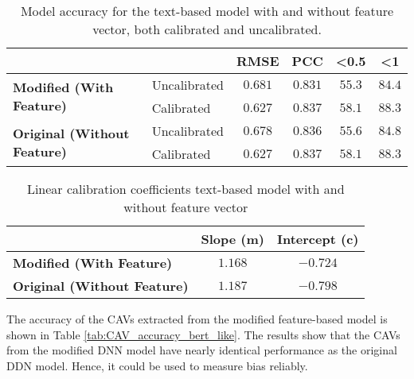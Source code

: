 \begin{table}[H]
    \centering
    \begin{tabular}{|l|l|c|c|c|c|}
        \hline
        \multicolumn{2}{|l|}{\textbf{}} & \textbf{RMSE} & \textbf{PCC} & \textbf{\textless 0.5} & \textbf{\textless 1}          \\ \hline
        \multirow{2}{*}{\textbf{Modified (With Feature)}}
                                        & Uncalibrated  & $0.681$      & $0.831$                & $55.3$               & $84.4$ \\ \cline{2-6}
                                        & Calibrated    & $0.627$      & $0.837$                & $58.1$               & $88.3$ \\ \hline
        \multirow{2}{*}{\textbf{Original (Without Feature)}}
                                        & Uncalibrated  & $0.678$      & $0.836$                & $55.6$               & $84.8$ \\ \cline{2-6}
                                        & Calibrated    & $0.627$      & $0.837$                & $58.1$               & $88.3$ \\ \hline
    \end{tabular}
    \caption{Model accuracy for the text-based model with and without feature vector, both calibrated and uncalibrated.}
    \label{tab:model_accuracy_deep_fusion}
\end{table}


\begin{table}[H]
    \centering
    \begin{tabular}{|l|c|c|}
        \hline
        \textbf{}                           & \textbf{Slope (m)} & \textbf{Intercept (c)} \\ \hline
        \textbf{Modified (With Feature)}    & $1.168$            & $-0.724$               \\ \hline
        \textbf{Original (Without Feature)} & $1.187$            & $-0.798$               \\ \hline
    \end{tabular}
    \caption{Linear calibration coefficients text-based model with and without feature vector}
    \label{tab:linear_regression_coefficients_deep_fusion}
\end{table}

The accuracy of the CAVs extracted from the modified feature-based model is shown in Table \ref{tab:CAV_accuracy_bert_like}. The results show that the CAVs from the modified DNN model have nearly identical performance as the original DDN model. Hence, it could be used to measure bias reliably.

